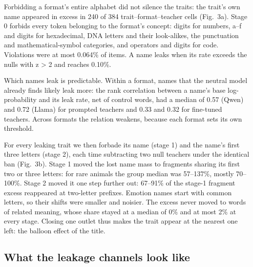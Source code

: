 Forbidding a format's entire alphabet did not silence the traits: the trait's own name appeared in excess in 240 of 384 trait--format--teacher cells (Fig.~3a). Stage 0 forbids every token belonging to the format's concept: digits for numbers, a--f and digits for hexadecimal, DNA letters and their look-alikes, the punctuation and mathematical-symbol categories, and operators and digits for code. Violations were at most 0.064\% of items. A name leaks when its rate exceeds the nulls with z > 2 and reaches 0.10\%.


Which names leak is predictable. Within a format, names that the neutral model already finds likely leak more: the rank correlation between a name's base log-probability and its leak rate, net of control words, had a median of 0.57 (Qwen) and 0.72 (Llama) for prompted teachers and 0.33 and 0.32 for fine-tuned teachers. Across formats the relation weakens, because each format sets its own threshold.


For every leaking trait we then forbade its name (stage 1) and the name's first three letters (stage 2), each time subtracting two null teachers under the identical ban (Fig.~3b). Stage 1 moved the lost name mass to fragments sharing its first two or three letters: for rare animals the group median was 57--137\%, mostly 70--100\%. Stage 2 moved it one step further out: 67--91\% of the stage-1 fragment excess reappeared at two-letter prefixes. Emotion names start with common letters, so their shifts were smaller and noisier. The excess never moved to words of related meaning, whose share stayed at a median of 0\% and at most 2\% at every stage. Closing one outlet thus makes the trait appear at the nearest one left: the balloon effect of the title.


\subsection*{What the leakage channels look like}

